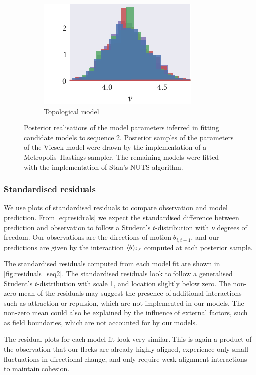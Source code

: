\begin{figure}[p]
\begin{subfigure}[b]{\textwidth}
    \includegraphics{seq2/top_hist_nu.pdf}%
    \caption{Topological model}
  \end{subfigure}
  \vspace{-2em}
  \caption{Posterior realisations of the model parameters inferred in fitting
  candidate models to sequence 2. Posterior samples of the parameters of the
  Vicsek model were drawn by the implementation of a Metropolis--Hastings
  sampler. The remaining models were fitted with the implementation of Stan's
  NUTS algorithm.}
  \label{fig:posteriors_seq2}
\end{figure}

\subsubsection{Standardised residuals}

We use plots of standardised residuals to compare observation and model
prediction. From \cref{eq:residuals} we expect the standardised difference
between prediction and observation to follow a Student's $t$-distribution with
$\nu$ degrees of freedom. Our observations are the directions of motion
$\theta_{i,t+1}$, and our predictions are given by the interaction
$\langle\theta\rangle_{i,t}$ computed at each posterior sample.

The standardised residuals computed from each model fit are shown in
\cref{fig:residuals_seq2}. The standardised residuals look to follow a
generalised Student's $t$-distribution with scale 1, and location slightly
below zero. The non-zero mean of the residuals may suggest the presence of
additional interactions such as attraction or repulsion, which are not
implemented in our models. The non-zero mean could also be explained by the
influence of external factors, such as field boundaries, which are not
accounted for by our models.

The residual plots for each model fit look very similar. This is again a
product of the observation that our flocks are already highly aligned,
experience only small fluctuations in directional change, and only require weak
alignment interactions to maintain cohesion.

